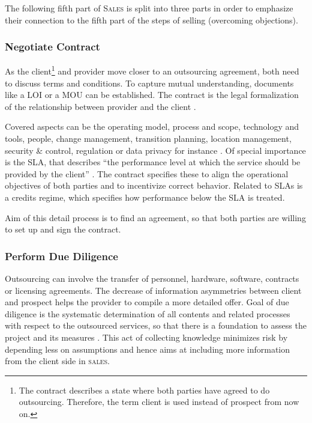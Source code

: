 	The following fifth part of \textsc{Sales} is split into three parts in order to emphasize their connection to the fifth part of the steps of selling (overcoming objections). 
	
	
	\subsubsection{Negotiate Contract}
	
	As the client\footnote{The contract describes a state where both parties have agreed to do outsourcing. Therefore, the term client is used instead of prospect from now on.} and provider move closer to an outsourcing agreement, both need to discuss terms and conditions. To capture mutual understanding, documents like a \acrfull{LOI} or a \acrfull{MOU} can be established. The contract is the legal formalization of the relationship between provider and the client \citep{Franceschini_2003}.
	
	Covered aspects can be the operating model, process and scope, technology and tools, people, change management, transition planning, location management, security \& control, regulation or data privacy for instance \citep{deloittehandbook}. 
	Of special importance is the \acrfull{SLA}, that describes \enquote{the performance level at which the service should be provided by the client} \citep[]{deloittehandbook}. The contract specifies these to align the operational objectives of both parties and to incentivize correct behavior. Related to \acrshort{SLA}s is a credits regime, which specifies how performance below the \acrshort{SLA} is treated. 
	
	Aim of this detail process is to find an agreement, so that both parties are willing to set up and sign the contract.
	
	\subsubsection{Perform Due Diligence}
	
	Outsourcing can involve the transfer of personnel, hardware, software, contracts or licensing agreements. The decrease of information asymmetries between client and prospect helps the provider to compile a more detailed offer. Goal of due diligence is the systematic determination of all contents and related processes with respect to the outsourced services, so that there is a foundation to assess the project and its measures \citep[]{bitkom2008}. This act of collecting knowledge minimizes risk by depending less on assumptions and hence aims at including more information from the client side in \textsc{sales}. 
	
